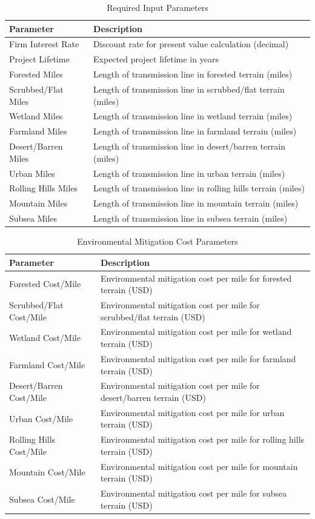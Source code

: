 \documentclass[12pt]{article}
\begin{document}
\begin{table}[H]
\centering
\caption{Required Input Parameters}
\begin{tabular}{@{}ll@{}}
\toprule
\textbf{Parameter} & \textbf{Description} \\
\midrule
Firm Interest Rate & Discount rate for present value calculation (decimal) \\
Project Lifetime & Expected project lifetime in years \\
Forested Miles & Length of transmission line in forested terrain (miles) \\
Scrubbed/Flat Miles & Length of transmission line in scrubbed/flat terrain (miles) \\
Wetland Miles & Length of transmission line in wetland terrain (miles) \\
Farmland Miles & Length of transmission line in farmland terrain (miles) \\
Desert/Barren Miles & Length of transmission line in desert/barren terrain (miles) \\
Urban Miles & Length of transmission line in urban terrain (miles) \\
Rolling Hills Miles & Length of transmission line in rolling hills terrain (miles) \\
Mountain Miles & Length of transmission line in mountain terrain (miles) \\
Subsea Miles & Length of transmission line in subsea terrain (miles) \\
\bottomrule
\end{tabular}
\end{table}

\begin{table}[H]
\centering
\caption{Environmental Mitigation Cost Parameters}
\begin{tabular}{@{}ll@{}}
\toprule
\textbf{Parameter} & \textbf{Description} \\
\midrule
Forested Cost/Mile & Environmental mitigation cost per mile for forested terrain (USD) \\
Scrubbed/Flat Cost/Mile & Environmental mitigation cost per mile for scrubbed/flat terrain (USD) \\
Wetland Cost/Mile & Environmental mitigation cost per mile for wetland terrain (USD) \\
Farmland Cost/Mile & Environmental mitigation cost per mile for farmland terrain (USD) \\
Desert/Barren Cost/Mile & Environmental mitigation cost per mile for desert/barren terrain (USD) \\
Urban Cost/Mile & Environmental mitigation cost per mile for urban terrain (USD) \\
Rolling Hills Cost/Mile & Environmental mitigation cost per mile for rolling hills terrain (USD) \\
Mountain Cost/Mile & Environmental mitigation cost per mile for mountain terrain (USD) \\
Subsea Cost/Mile & Environmental mitigation cost per mile for subsea terrain (USD) \\
\bottomrule
\end{tabular}
\end{table}
\end{document}
